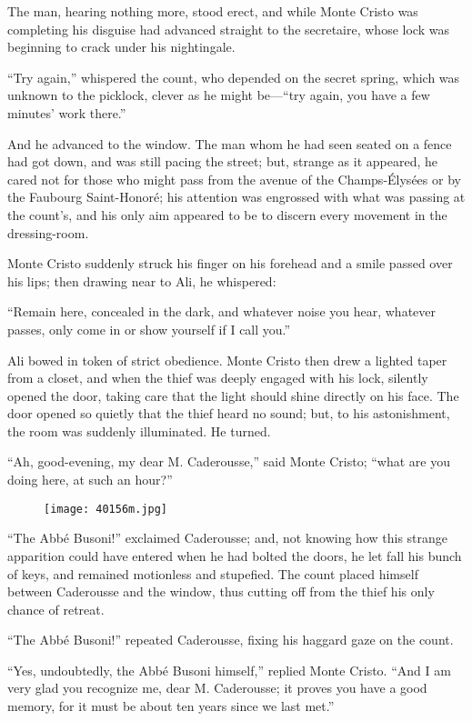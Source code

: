 The man, hearing nothing more, stood erect, and while Monte Cristo was
completing his disguise had advanced straight to the secretaire, whose
lock was beginning to crack under his nightingale.

“Try again,” whispered the count, who depended on the secret spring,
which was unknown to the picklock, clever as he might be—“try again,
you have a few minutes’ work there.”

And he advanced to the window. The man whom he had seen seated on a
fence had got down, and was still pacing the street; but, strange as it
appeared, he cared not for those who might pass from the avenue of the
Champs-Élysées or by the Faubourg Saint-Honoré; his attention was
engrossed with what was passing at the count’s, and his only aim
appeared to be to discern every movement in the dressing-room.

Monte Cristo suddenly struck his finger on his forehead and a smile
passed over his lips; then drawing near to Ali, he whispered:

“Remain here, concealed in the dark, and whatever noise you hear,
whatever passes, only come in or show yourself if I call you.”

Ali bowed in token of strict obedience. Monte Cristo then drew a
lighted taper from a closet, and when the thief was deeply engaged with
his lock, silently opened the door, taking care that the light should
shine directly on his face. The door opened so quietly that the thief
heard no sound; but, to his astonishment, the room was suddenly
illuminated. He turned.

“Ah, good-evening, my dear M. Caderousse,” said Monte Cristo; “what are
you doing here, at such an hour?”

\begin{figure}[ht]
\texttt{[image: 40156m.jpg]}
\end{figure}

“The Abbé Busoni!” exclaimed Caderousse; and, not knowing how this
strange apparition could have entered when he had bolted the doors, he
let fall his bunch of keys, and remained motionless and stupefied. The
count placed himself between Caderousse and the window, thus cutting
off from the thief his only chance of retreat.

“The Abbé Busoni!” repeated Caderousse, fixing his haggard gaze on the
count.

“Yes, undoubtedly, the Abbé Busoni himself,” replied Monte Cristo. “And
I am very glad you recognize me, dear M. Caderousse; it proves you have
a good memory, for it must be about ten years since we last met.”

